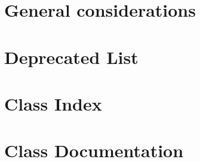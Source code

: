 \let\mypdfximage\pdfximage\def\pdfximage{\immediate\mypdfximage}\documentclass[twoside]{book}
\newcommand{\+}{\discretionary{\mbox{\scriptsize$\hookleftarrow$}}{}{}}
\newcommand{\clearemptydoublepage}{%
  \newpage{\pagestyle{empty}\cleardoublepage}%
}
\begin{document}
\chapter{General considerations}
\label{general_considerations}

\chapter{Deprecated List}
\label{deprecated}

\chapter{Class Index}

\chapter{Class Documentation}






















\backmatter
\newpage
{}
\clearemptydoublepage
{}
\printindex
\end{document}
